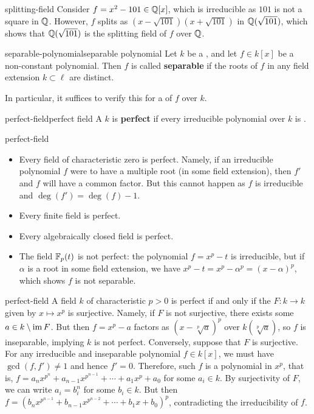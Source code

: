 \begin{example}{splitting-field}
    Consider $f = x^2 - 101 \in \mathbb{Q}[x]$, which is irreducible as $101$ is not a square in $\mathbb{Q}$. However, $f$ splits as $(x - \sqrt{101})(x + \sqrt{101})$ in $\mathbb{Q}(\sqrt{101})$, which shows that $\mathbb{Q}(\sqrt{101})$ is the splitting field of $f$ over $\mathbb{Q}$.
\end{example}

\begin{topic}{separable-polynomial}{separable polynomial}
    Let $k$ be a , and let $f \in k[x]$ be a non-constant polynomial. Then $f$ is called \textbf{separable} if the roots of $f$ in any field extension $k \subset \ell$ are distinct.
    
    In particular, it suffices to verify this for a  of $f$ over $k$.
\end{topic}

\begin{topic}{perfect-field}{perfect field}
    A  $k$ is \textbf{perfect} if every irreducible polynomial over $k$ is .
\end{topic}

\begin{example}{perfect-field}
    \begin{itemize}
        \item Every field of characteristic zero is perfect. Namely, if an irreducible polynomial $f$ were to have a multiple root (in some field extension), then $f'$ and $f$ will have a common factor. But this cannot happen as $f$ is irreducible and $\deg(f') = \deg(f) - 1$.
        \item Every finite field is perfect.
        \item Every algebraically closed field is perfect.
        \item The field $\mathbb{F}_p(t)$ is not perfect: the polynomial $f = x^p - t$ is irreducible, but if $\alpha$ is a root in some field extension, we have $x^p - t = x^p - \alpha^p = (x - \alpha)^p$, which shows $f$ is not separable.
    \end{itemize}
\end{example}

\begin{example}{perfect-field}
    A field $k$ of characteristic $p > 0$ is perfect if and only if the  $F : k \to k$ given by $x \mapsto x^p$ is surjective. Namely, if $F$ is not surjective, there exists some $a \in k \setminus \operatorname{im} F$. But then $f = x^p - a$ factors as $(x - \sqrt[p]{a})^p$ over $k(\sqrt[p]{a})$, so $f$ is inseparable, implying $k$ is not perfect. Conversely, suppose that $F$ is surjective. For any irreducible and inseparable polynomial $f \in k[x]$, we must have $\gcd(f, f') \ne 1$ and hence $f' = 0$. Therefore, such $f$ is a polynomial in $x^p$, that is, $f = a_n x^{p^n} + a_{n - 1} x^{p^{n - 1}} + \cdots + a_1 x^p + a_0$ for some $a_i \in k$. By surjectivity of $F$, we can write $a_i = b_i^n$ for some $b_i \in k$. But then $f = (b_n x^{p^{n - 1}} + b_{n - 1} x^{p^{n - 2}} + \cdots + b_1 x + b_0)^p$, contradicting the irreducibility of $f$.
\end{example}


